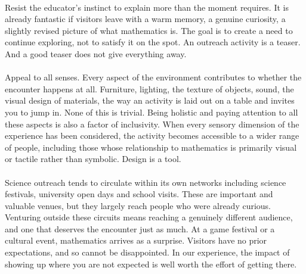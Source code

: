 \documentclass{notices}
\begin{document}
\\


Resist the educator's instinct to explain more than the moment requires. It is already fantastic if visitors leave with a warm memory, a genuine curiosity, a slightly revised picture of what mathematics is. The goal is to create a need to continue exploring, not to satisfy it on the spot. An outreach activity is a teaser. And a good teaser does not give everything away.\\


\\

Appeal to all senses. Every aspect of the environment contributes to whether the encounter happens at all. Furniture, lighting, the texture of objects, sound, the visual design of materials, the way an activity is laid out on a table and invites you to jump in. None of this is trivial. Being holistic and paying attention to all these aspects is also a factor of inclusivity. When every sensory dimension of the experience has been considered, the activity becomes accessible to a wider range of people, including those whose relationship to mathematics is primarily visual or tactile rather than symbolic. Design is a tool.\\


\\

Science outreach tends to circulate within its own networks including science festivals, university open days and school visits. These are important and valuable venues, but they largely reach people who were already curious. Venturing outside these circuits means reaching a genuinely different audience, and one that deserves the encounter just as much. At a game festival or a cultural event, mathematics arrives as a surprise. Visitors have no prior expectations, and so cannot be disappointed. In our experience, the impact of showing up where you are not expected is well worth the effort of getting there.\\


\end{document}
